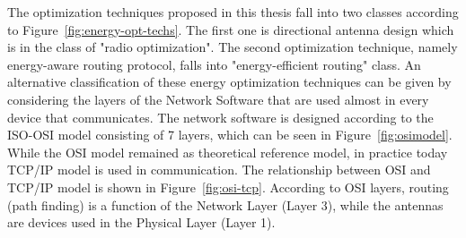 \documentclass[12pt, oneandhalf, chaparabic, sees, ms]{metu}
\begin{document}
\newpage
The optimization techniques proposed in this thesis fall into two classes according to Figure~\ref{fig:energy-opt-techs}. 
The first one is directional antenna design which is in the class of "radio optimization".
The second optimization technique, namely energy-aware routing protocol, falls into "energy-efficient routing" class. 
An alternative classification of these energy optimization techniques
can be given by considering the layers of the Network Software that are used almost in every device that communicates. 
The network software is designed according to the ISO-OSI model consisting of 7 layers, which can be seen in Figure~\ref{fig:osimodel}. 
While the OSI model remained as 
theoretical reference model, in practice today TCP/IP model is used in communication. The relationship between OSI and TCP/IP model is shown in Figure~\ref{fig:osi-tcp}.
According to OSI layers, routing (path finding) is a function of the Network Layer (Layer 3), while the antennas are devices used in the Physical Layer (Layer 1).
%
%
%
\end{document}
